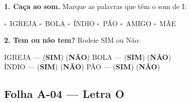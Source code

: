 \begin{somletra}[title={\faMusic~Atividade de Som da Vogal --- B\^onus (n\~ao vale nota)}]
\textbf{1. Ca\c{c}a ao som.} Marque as palavras que t\^e{}m o som de I:
\begin{center}
$\square$~IGREJA \quad $\square$~BOLA \quad $\square$~\'INDIO \quad $\square$~P\~AO \quad $\square$~AMIGO \quad $\square$~M\~AE
\end{center}

\textbf{2. Tem ou n\~ao{} tem?} Rodeie SIM ou N\~ao:
\begin{center}
IGREJA --- (\textbf{SIM}) (\textbf{N\~AO}) \quad BOLA --- (\textbf{SIM}) (\textbf{N\~AO}) \\ \'INDIO --- (\textbf{SIM}) (\textbf{N\~AO}) \quad P\~AO --- (\textbf{SIM}) (\textbf{N\~AO})
\end{center}
\end{somletra}



\subsection{Folha A-04 --- Letra O}

